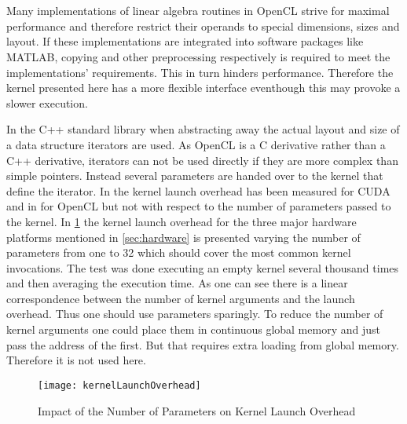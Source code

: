 \section{}

\subsection{}

Many implementations of linear algebra routines in OpenCL strive for maximal 
performance and therefore restrict their operands to special dimensions, sizes 
and layout. If these implementations are integrated into software packages like 
MATLAB, copying and other preprocessing respectively is required to meet the 
implementations' requirements. This in turn hinders performance. Therefore the 
kernel presented here has a more flexible interface eventhough this may provoke 
a slower execution.

In the C++ standard library when abstracting away the actual layout and size of 
a data structure iterators are used. As OpenCL is a C derivative rather than a 
C++ derivative, iterators can not be used directly if they are more complex 
than simple pointers. Instead several parameters are handed over to the kernel 
that define the iterator. In \cite{Volkov2008} the kernel launch overhead has 
been measured for CUDA and in \cite{Dongarra2013} for OpenCL but not with 
respect to the number of parameters passed to the kernel. In 
\cref{fig:kernelLaunchOverhead} the kernel launch overhead for the three major 
hardware platforms mentioned in \cref{sec:hardware} is presented varying the 
number of parameters from one to 32 which should cover the most common kernel 
invocations. The test was done executing an empty kernel several thousand times 
and then averaging the execution time. As one can see there is a linear 
correspondence between the number of kernel arguments and the launch overhead. 
Thus one should use parameters sparingly. To reduce the number of kernel 
arguments 
one could place them in continuous global memory and just pass the address of 
the first. But that requires extra loading from global memory. Therefore it is 
not used here.

\begin{figure}[htbp]
 \centering
 \texttt{[image: kernelLaunchOverhead]}
 \caption{Impact of the Number of Parameters on Kernel Launch Overhead}
 \label{fig:kernelLaunchOverhead}
\end{figure}

